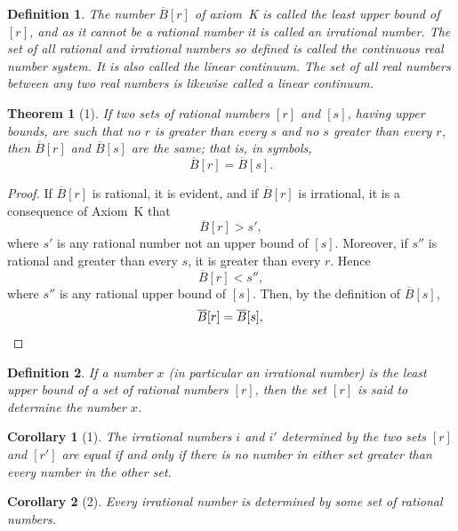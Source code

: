 \documentclass[a4paper,12pt]{book}[2004/02/16]
\providecommand{\hyperlink}[2]{#2}
\providecommand{\hypertarget}[2]{#2}
\theoremstyle{ilemma}
\theoremstyle{itheorem}
\newtheorem{theorem}{Theorem}
\theoremstyle{iother}
\theoremstyle{icorollary}
\theoremstyle{numcorollary}
\newtheorem{ncorollary}{Corollary}
\theoremstyle{idefinition}
\newtheorem*{definition}{Definition}
\begin{document}
\begin{definition}
The number $\overline{B}[r]$ of \hyperlink{axiomK}{axiom~K} is called the
least upper bound of $[r]$, and as it cannot be a rational number it
is called an \textit{irrational} number. The set of all rational and
irrational numbers so defined is called the \textit{continuous real
number system}. It is also called \textit{the linear continuum.} The
set of all real numbers between any two real numbers is likewise
called a linear continuum.
\end{definition}
\begin{theorem}[1]\hypertarget{thm1}{}
If two sets of rational numbers $[r]$ and
$[s]$, having upper bounds, are such that no $r$ is greater than every
$s$ and no $s$ greater than every $r$, then $\overline{B}[r]$ and
$\overline{B}[s]$ are the same; that is, in symbols,
\[
  \overline{B}[r] = \overline{B}[s].
\]
\end{theorem}
\begin{proof}
If $\overline{B}[r]$ is rational, it is evident,
and if $\overline{B}[r]$ is irrational, it is a consequence of \hyperlink{axiomK}{Axiom~K}
that
\[
  \overline{B}[r] > s',
\]
where $s'$ is any rational number not an upper bound of $[s]$.
Moreover, if $s''$ is rational and greater than every $s$, it is
greater than every $r$. Hence
\[
  \overline{B}[r] < s'',
\]
where $s''$ is any rational upper bound of $[s]$. Then, by the
definition of $\overline{B}[s]$,
\[
  \overline{B}[r] = \overline{B}[s],\qedhere
\]
\end{proof}
\begin{definition}
If a number $x$ (in particular an irrational
number) is the least upper bound of a set of rational numbers $[r]$,
then the set $[r]$ is said to \textit{determine} the number $x$.
\end{definition}
\begin{ncorollary}[1]\label{cor1p5}\hypertarget{cor1p5}{}
The irrational numbers $i$ and $i'$ determined by the two sets $[r]$
and $[r']$ are equal if and only if there is no number in either set
greater than every number in the other set.
\end{ncorollary}
\begin{ncorollary}[2]\label{cor2p5}\hypertarget{cor2p5}{}
Every irrational number is determined by some set of rational numbers.
\end{ncorollary}
\end{document}
